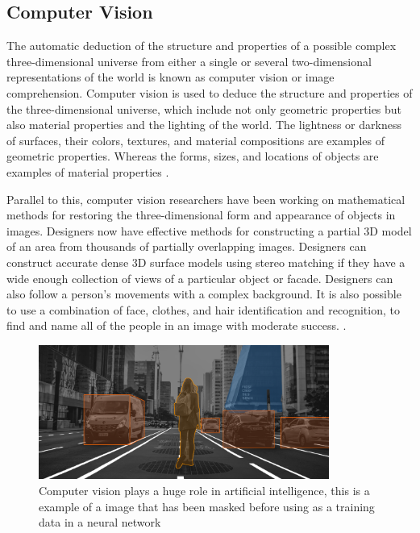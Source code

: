 \subsection{Computer Vision}
The automatic deduction of the structure and properties of a possible complex three-dimensional universe from either a single or several two-dimensional representations of the world is known as computer vision or image comprehension. Computer vision is used to deduce the structure and properties of the three-dimensional universe, which include not only geometric properties but also material properties and the lighting of the world. The lightness or darkness of surfaces, their colors, textures, and material compositions are examples of geometric properties. Whereas the forms, sizes, and locations of objects are examples of material properties \cite{nalwa_what_1993}. %

Parallel to this, computer vision researchers have been working on mathematical methods for restoring the three-dimensional form and appearance of objects in images. Designers now have effective methods for constructing a partial 3D model of an area from thousands of partially overlapping images. Designers can construct accurate dense 3D surface models using stereo matching if they have a wide enough collection of views of a particular object or facade. Designers can also follow a person's movements with a complex background. It is also possible to use a combination of face, clothes, and hair identification and recognition, to find and name all of the people in an image with moderate success. \cite{szeliski_introduction_2010}.

\begin{figure}[ht]
    \centering
    \includegraphics[width=0.85\textwidth]{graphics/mask.png}
    \caption{Computer vision plays a huge role in artificial intelligence, this is a example of a image that has been masked before using as a training data in a neural network  \cite{ambalina_5_2020}}
    \label{fig:mask}
\end{figure}

